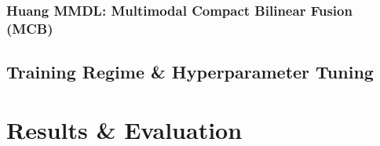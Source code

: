 \documentclass[11pt,a4paper]{article}
\begin{document}
\subsubsection{Huang MMDL: Multimodal Compact Bilinear Fusion (MCB)}

\subsection{Training Regime \& Hyperparameter Tuning}
\label{subsec:training}


\section{Results \& Evaluation}
\label{sec:results}

\end{document}
